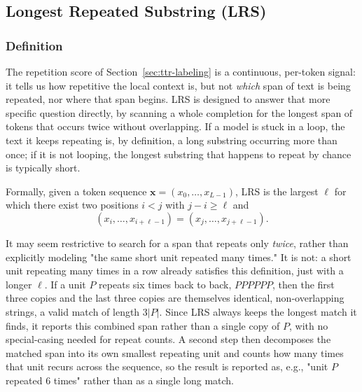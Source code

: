 \documentclass{article}
\begin{document}
\subsection{Longest Repeated Substring (LRS)}
\label{sec:lrs-labeling}

\subsubsection{Definition}

The repetition score of Section~\ref{sec:ttr-labeling} is a continuous,
per-token signal: it tells us how repetitive the local context is, but not
\emph{which} span of text is being repeated, nor where that span begins.
LRS is designed to answer that more specific question directly, by scanning
a whole completion for the longest span of tokens that occurs twice without
overlapping. If a model is stuck in a loop, the text it keeps repeating is,
by definition, a long substring occurring more than once; if it is not
looping, the longest substring that happens to repeat by chance is
typically short.

Formally, given a token sequence $\mathbf{x}=(x_0,\ldots,x_{L-1})$, LRS is
the largest $\ell$ for which there exist two positions $i<j$ with
$j-i\geq\ell$ and
\[
(x_i,\ldots,x_{i+\ell-1}) = (x_j,\ldots,x_{j+\ell-1}).
\]

It may seem restrictive to search for a span that repeats only \emph{twice},
rather than explicitly modeling "the same short unit repeated many times."
It is not: a short unit repeating many times in a row already satisfies this
definition, just with a longer $\ell$. If a unit $P$ repeats six times back
to back, $PPPPPP$, then the first three copies and the last three copies are
themselves identical, non-overlapping strings, a valid match of length
$3|P|$. Since LRS always keeps the longest match it finds, it reports this
combined span rather than a single copy of $P$, with no special-casing
needed for repeat counts. A second step then decomposes the matched span
into its own smallest repeating unit and counts how many times that unit
recurs across the sequence, so the result is reported as, e.g., "unit $P$
repeated 6 times" rather than as a single long match.
\end{document}
